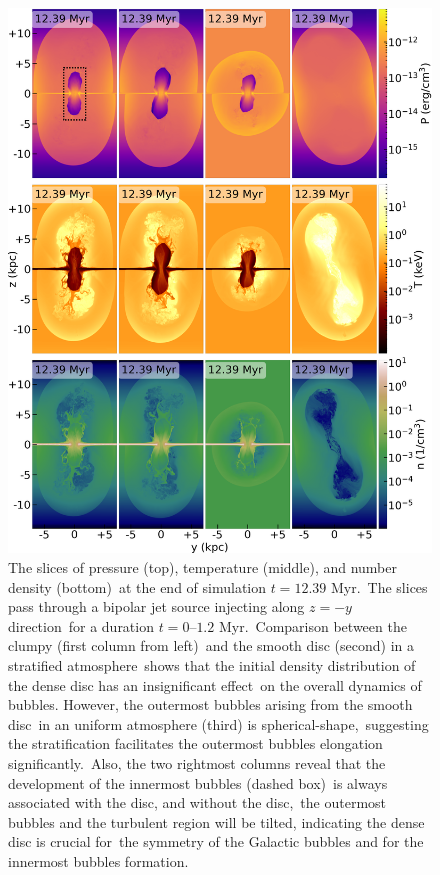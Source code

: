 \documentclass[twocolumn]{aastex631}
\begin{document}
  \begin{figure}
    \includegraphics[width=\columnwidth]{figures/fig__jetI5+ismSeed3-45deg_no-disc-stratified-ambient-Pres-Dens-Temp.png}
    \caption{
             The slices of pressure (top), temperature (middle), and number density (bottom)\
             at the end of simulation $t=12.39$ Myr.\
             The slices pass through a bipolar jet source injecting along $z=-y$ direction\
             for a duration $t=0$--$1.2$ Myr.\
             Comparison between the clumpy (first column from left)\
             and the smooth disc (second) in a stratified atmosphere\
             shows that the initial density distribution of the dense disc has an insignificant effect\
             on the overall dynamics of bubbles. However, the outermost bubbles arising from the smooth disc\
             in an uniform atmosphere (third) is spherical-shape,\
             suggesting the stratification facilitates the outermost bubbles elongation significantly.\
             Also, the two rightmost columns reveal that the development of the innermost bubbles (dashed box)\
             is always associated with the disc, and without the disc,\
             the outermost bubbles and the turbulent region will be tilted,
             indicating the dense disc is crucial for\
             the symmetry of the Galactic bubbles and for the innermost bubbles formation.
             }
    \label{fig__jetI5+ismSeed3-45deg_no-disc-stratified-ambient-Pres-Dens-Temp}
  \end{figure}
\end{document}
